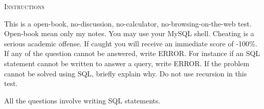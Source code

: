 \textsc{Instructions}
\begin{enumerate}
\li This is a open-book, no-discussion, no-calculator, no-browsing-on-the-web
test.
Open-book mean only my notes.
You may use your MySQL shell.
\li Cheating is a serious academic offense. If caught you will 
receive an immediate score of -100\%.
\li
If any of the question cannot be answered, write ERROR.
For instance if an SQL statement cannot be written to answer a query,
write ERROR.
If the problem cannot be solved using SQL,
briefly explain why.
\li Do not use recursion in this test.
\end{enumerate}

All the questions involve writing SQL statements.

\vspace{1cm}

